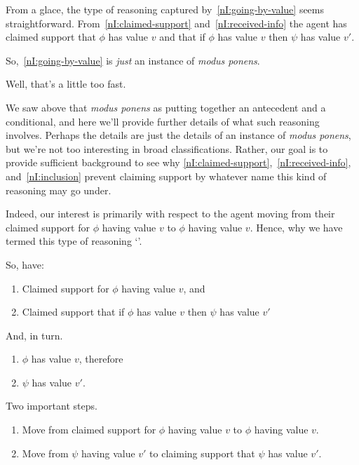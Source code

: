 \begin{note}
From a glace, the type of reasoning captured by~\ref{nI:going-by-value} seems straightforward.
  From~\ref{nI:claimed-support} and~\ref{nI:received-info} the agent has claimed support that \(\phi\) has value \(v\) and that if \(\phi\) has value \(v\) then \(\psi\) has value \(v'\).

  So,~\ref{nI:going-by-value} is \emph{just} an instance of \emph{modus ponens}.

  Well, that's a little too fast.

  We saw above that \emph{modus ponens} as putting together an antecedent and a conditional, and here we'll provide further details of what such reasoning involves.
  Perhaps the details are just the details of an instance of \emph{modus ponens}, but we're not too interesting in broad classifications.
  Rather, our goal is to provide sufficient background to see why \ref{nI:claimed-support},~\ref{nI:received-info}, and~\ref{nI:inclusion} prevent claiming support by whatever name this kind of reasoning may go under.

  Indeed, our interest is primarily with respect to the agent moving from their claimed support for \(\phi\) having value \(v\) to \(\phi\) having value \(v\).
  Hence, why we have termed this type of reasoning `\RBV{-}'.
\end{note}

\begin{note}[Breakdown]
  So, have:
  \begin{enumerate}
  \item Claimed support for \(\phi\) having value \(v\), and
  \item Claimed support that if \(\phi\) has value \(v\) then \(\psi\) has value \(v'\)
  \end{enumerate}
  And, in turn.
  \begin{enumerate}
  \item \(\phi\) has value \(v\), therefore
  \item \(\psi\) has value \(v'\).
  \end{enumerate}
  Two important steps.
  \begin{enumerate}
  \item Move from claimed support for \(\phi\) having value \(v\) to \(\phi\) having value \(v\).
  \item Move from \(\psi\) having value \(v'\) to claiming support that \(\psi\) has value \(v'\).
  \end{enumerate}
\end{note}

